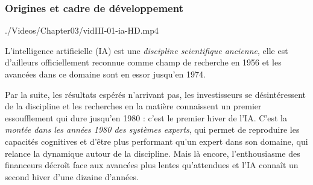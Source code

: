 \subsubsection[Origines]{Origines et cadre de développement}
\label{subsub:III.1.1.1}

\begin{marginvideo}
		{./Videos/Chapter03/vidIII-01-ia-HD.mp4}%
\end{marginvideo}

L'intelligence artificielle (IA) est une \emph{discipline scientifique ancienne}, elle est d’ailleurs officiellement reconnue comme champ de recherche en 1956 et les avancées dans ce domaine sont en essor jusqu’en 1974.

Par la suite, les résultats espérés n’arrivant pas, les investisseurs se désintéressent de la discipline et les recherches en la matière connais\-sent un premier essoufflement qui dure jusqu’en 1980 : c’est le premier hiver de l’IA. C’est la \emph{montée dans les années 1980 des systèmes experts}, qui permet de reproduire les capacités cognitives et d’être plus performant qu’un expert dans son domaine, qui relance la dynamique autour de la discipline. Mais là encore, l'enthousiasme des financeurs décroît face aux avancées plus lentes qu’attendues et l’IA connaît un second hiver d’une dizaine d’années.

